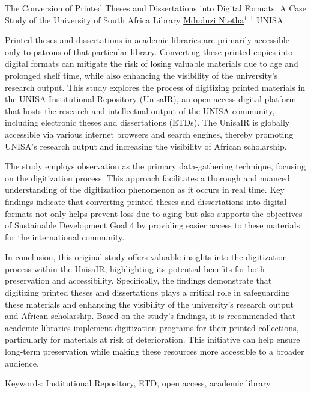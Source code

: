 
    \begin{abstract_online}{The Conversion of Printed Theses and Dissertations into Digital Formats: A Case Study of the University of South Africa Library}{%
    \underline{Mduduzi Ntetha}$^{1}$}{%
    }{%
    $^1$ UNISA\newline{}
}

Printed theses and dissertations in academic libraries are primarily accessible only to patrons of that particular library. Converting these printed copies into digital formats can mitigate the risk of losing valuable materials due to age and prolonged shelf time, while also enhancing the visibility of the university's research output. This study explores the process of digitizing printed materials in the UNISA Institutional Repository (UnisaIR), an open-access digital platform that hosts the research and intellectual output of the UNISA community, including electronic theses and dissertations (ETDs). The UnisaIR is globally accessible via various internet browsers and search engines, thereby promoting UNISA’s research output and increasing the visibility of African scholarship.

The study employs observation as the primary data-gathering technique, focusing on the digitization process. This approach facilitates a thorough and nuanced understanding of the digitization phenomenon as it occurs in real time. Key findings indicate that converting printed theses and dissertations into digital formats not only helps prevent loss due to aging but also supports the objectives of Sustainable Development Goal 4 by providing easier access to these materials for the international community.

In conclusion, this original study offers valuable insights into the digitization process within the UnisaIR, highlighting its potential benefits for both preservation and accessibility. Specifically, the findings demonstrate that digitizing printed theses and dissertations plays a critical role in safeguarding these materials and enhancing the visibility of the university's research output and African scholarship. Based on the study's findings, it is recommended that academic libraries implement digitization programs for their printed collections, particularly for materials at risk of deterioration. This initiative can help ensure long-term preservation while making these resources more accessible to a broader audience.

Keywords: Institutional Repository, ETD, open access, academic library
\end{abstract_online}

